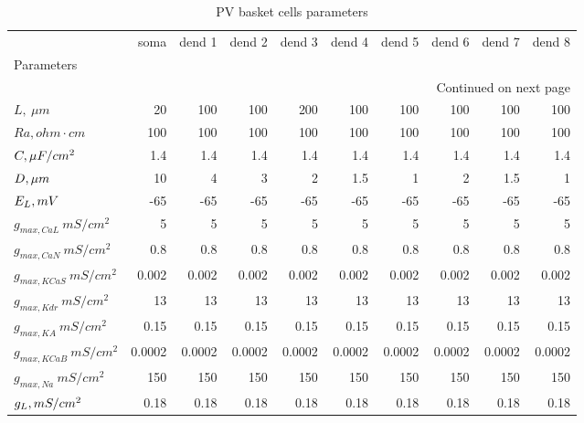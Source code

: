 \begin{longtable}{lrrrrrrrrr}
\caption{PV basket cells parameters}\label{ca1_pvbas_cell_parameters}\\
\toprule
{} &   soma & dend 1 & dend 2 & dend 3 & dend 4 & dend 5 & dend 6 & dend 7 & dend 8 \\
Parameters       &        &        &        &        &        &        &        &        &        \\
\midrule
\endhead
\midrule
\multicolumn{10}{r}{{Continued on next page}} \\
\midrule
\endfoot

\bottomrule
\endlastfoot
$L, \ \mu m$ &     20 &    100 &    100 &    200 &    100 &    100 &    100 &    100 &    100 \\
$Ra,
 ohm \cdot cm$               &    100 &    100 &    100 &    100 &    100 &    100 &    100 &    100 &    100 \\
$C, \linebreak \mu F / cm^2$               &    1.4 &    1.4 &    1.4 &    1.4 &    1.4 &    1.4 &    1.4 &    1.4 &    1.4 \\
$D,\linebreak \mu m$             &     10 &      4 &      3 &      2 &    1.5 &      1 &      2 &    1.5 &      1 \\
$E_L, \linebreak mV$        &    -65 &    -65 &    -65 &    -65 &    -65 &    -65 &    -65 &    -65 &    -65 \\
$g_{max, CaL     }\  mS / cm^2$&      5 &      5 &      5 &      5 &      5 &      5 &      5 &      5 &      5 \\
$g_{max, CaN     }\  mS / cm^2$&    0.8 &    0.8 &    0.8 &    0.8 &    0.8 &    0.8 &    0.8 &    0.8 &    0.8 \\
$g_{max, KCaS     }\  mS / cm^2$&  0.002 &  0.002 &  0.002 &  0.002 &  0.002 &  0.002 &  0.002 &  0.002 &  0.002 \\
$g_{max, Kdr  }\  mS / cm^2$&     13 &     13 &     13 &     13 &     13 &     13 &     13 &     13 &     13 \\
$g_{max, KA      }\  mS / cm^2$&   0.15 &   0.15 &   0.15 &   0.15 &   0.15 &   0.15 &   0.15 &   0.15 &   0.15 \\
$g_{max, KCaB    }\  mS / cm^2$& 0.0002 & 0.0002 & 0.0002 & 0.0002 & 0.0002 & 0.0002 & 0.0002 & 0.0002 & 0.0002 \\
$g_{max, Na }\  mS / cm^2$&    150 &    150 &    150 &    150 &    150 &    150 &    150 &    150 &    150 \\
$g_L, \linebreak mS / cm^2$     &   0.18 &   0.18 &   0.18 &   0.18 &   0.18 &   0.18 &   0.18 &   0.18 &   0.18 \\
\end{longtable}
